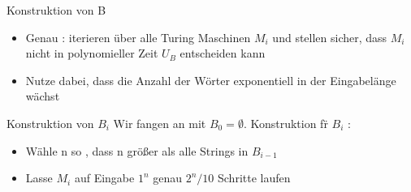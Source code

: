 \begin{frame}{Konstruktion von B}
	\begin{itemize}[<+->]
	\item Genau : iterieren über alle Turing Maschinen $M_i$ und stellen sicher, dass
		$M_i$ nicht in polynomieller Zeit $U_B$ entscheiden kann
	\item Nutze dabei, dass die Anzahl der Wörter exponentiell in der Eingabelänge wächst
	\end{itemize}
\end{frame}

\begin{frame}{Konstruktion von $B_i$}
	Wir fangen an mit $B_0 = \emptyset$. Konstruktion f\"r $B_i$ :
	\begin{itemize}
		\item Wähle n so , dass n größer als alle Strings in $B_{i-1}$
		\item Lasse $M_i$ auf Eingabe $1^n$ genau $2^n / 10$ Schritte laufen
	\end{itemize}
\end{frame}